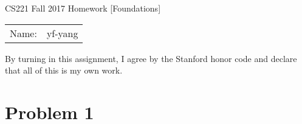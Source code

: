 

\geometry{left=2cm, right=2cm}



\begin{center}
{\Large CS221 Fall 2017 Homework [Foundations]}

\begin{tabular}{rl}
Name: & yf-yang
\end{tabular}
\end{center}

By turning in this assignment, I agree by the Stanford honor code and declare
that all of this is my own work.

\section*{Problem 1}

